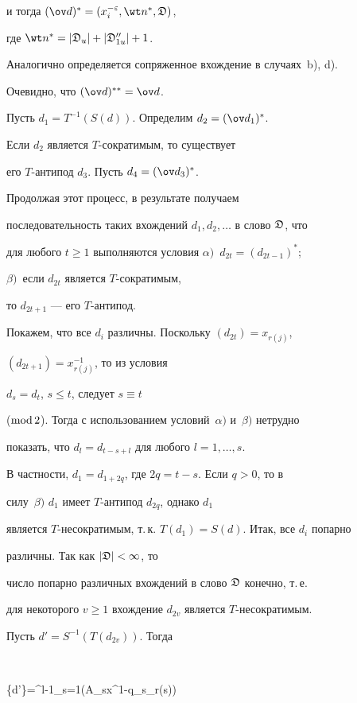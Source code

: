 и тогда $(\ov d)^*=(x^{-\varepsilon}_i,\wt n^*,\frak D)$,


где $\wt n^*=|\frak D_u|+|\frak D''_{1u}|+1$.


Аналогично определяется сопряженное вхождение в случаях~b), d).


Очевидно, что $(\ov d)^{**}=\ov d$.





Пусть $d_1=T^{-1}(S(d))$. Определим $d_2=(\ov d_1)^{*}$.


Если $d_2$ является $T$-сократимым, то существует 


его $T$-антипод $d_3$. Пусть $d_4=(\ov d_3)^{*}$.


Продолжая этот процесс, в результате получаем


последовательность таких вхождений $d_1,d_2,\dotsc$ в слово $\frak D$, что


для любого $t\ge 1$ выполняются условия $\alpha)$~$d_{2t}=(d_{2t-1})^{*}$;


$\beta)$~если $d_{2t}$ является $T$-сократимым,


то $d_{2t+1}$ --- его $T$-антипод.





Покажем, что все $d_i$ различны. Поскольку $(d_{2t})=x_{r(j)}$,


$(d_{2t+1})=x^{-1}_{r(j)}$, то из условия


$d_s=d_t$, $s\le t$, следует $s\equiv t$


($\operatorname{mod} 2$). Тогда с использованием условий~$\alpha)$ и~$\beta)$ нетрудно


показать, что $d_l=d_{t-s+l}$ для любого $l=1,\dotsc,s$.


В частности, $d_1=d_{1+2q}$, где $2q=t-s$. Если $q>0$, то в


силу~$\beta)$ $d_1$ имеет $T$-антипод $d_{2q}$, однако $d_1$


является $T$-несократимым, т.\,к. $T(d_1)=S(d)$. Итак, все $d_i$ попарно 


различны. Так как $|\frak D|<\infty$, то


число попарно различных вхождений в слово $\frak D$ конечно, т.\,е.


для некоторого $v\ge1$ вхождение $d_{2v}$ является $T$-несократимым.


Пусть $d'=S^{-1}(T(d_{2v}))$. Тогда


$$


\{d'\}=\prod^{l-1}_{s=1}(\frak A_sx^{1-q_s}_{r(s)})


